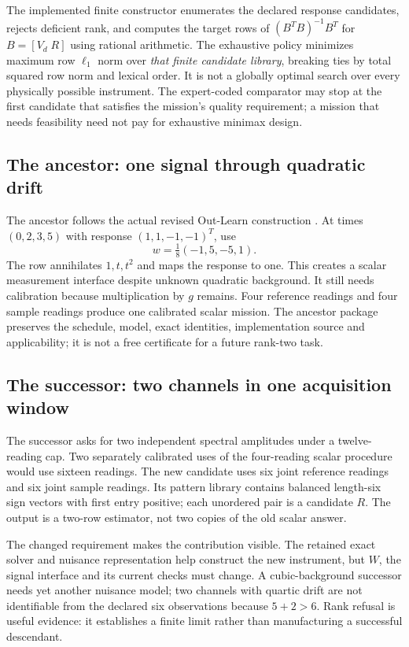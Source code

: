\documentclass[11pt]{article}
\begin{document}
The implemented finite constructor enumerates the declared response candidates, rejects deficient rank, and computes the target rows of $(B^TB)^{-1}B^T$ for $B=[V_d\;R]$ using rational arithmetic. The exhaustive policy minimizes maximum row $\ell_1$ norm over \emph{that finite candidate library}, breaking ties by total squared row norm and lexical order. It is not a globally optimal search over every physically possible instrument. The expert-coded comparator may stop at the first candidate that satisfies the mission's quality requirement; a mission that needs feasibility need not pay for exhaustive minimax design.

\subsection{The ancestor: one signal through quadratic drift}

The ancestor follows the actual revised Out-Learn construction \cite{outlearn}. At times $(0,2,3,5)$ with response $(1,1,-1,-1)^T$, use
\begin{equation}
w=\tfrac18(-1,5,-5,1).
\label{eq:ancestor}
\end{equation}
The row annihilates $1,t,t^2$ and maps the response to one. This creates a scalar measurement interface despite unknown quadratic background. It still needs calibration because multiplication by $g$ remains. Four reference readings and four sample readings produce one calibrated scalar mission. The ancestor package preserves the schedule, model, exact identities, implementation source and applicability; it is not a free certificate for a future rank-two task.

\subsection{The successor: two channels in one acquisition window}

The successor asks for two independent spectral amplitudes under a twelve-reading cap. Two separately calibrated uses of the four-reading scalar procedure would use sixteen readings. The new candidate uses six joint reference readings and six joint sample readings. Its pattern library contains balanced length-six sign vectors with first entry positive; each unordered pair is a candidate $R$. The output is a two-row estimator, not two copies of the old scalar answer.

The changed requirement makes the contribution visible. The retained exact solver and nuisance representation help construct the new instrument, but $W$, the signal interface and its current checks must change. A cubic-background successor needs yet another nuisance model; two channels with quartic drift are not identifiable from the declared six observations because $5+2>6$. Rank refusal is useful evidence: it establishes a finite limit rather than manufacturing a successful descendant.
\end{document}
